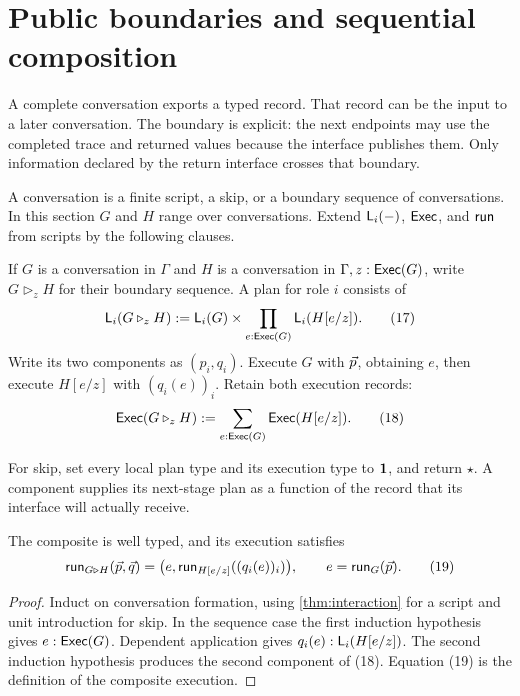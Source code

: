 \section{Public boundaries and sequential composition}
\label{sec:composition}

A complete conversation exports a typed record. That record can be the input
to a later conversation. The boundary is explicit: the next endpoints may use
the completed trace and returned values because the interface publishes them.
Only information declared by the return interface crosses that boundary.

A conversation is a finite script, a skip, or a boundary sequence of
conversations. In this section $G$ and $H$ range over conversations. Extend
$\mathsf L_{i}(-)$, $\mathsf{Exec}$, and $\mathsf{run}$ from scripts by the following clauses.

\begin{definition}
If $G$ is a conversation in $\Gamma$ and
$H$ is a conversation in $\Gamma,z:\mathsf{Exec}(G)$, write $G\mathbin{\triangleright_z}H$
for their boundary sequence. A plan for role $i$ consists of
\[
 \mathsf L_{i}(G\mathbin{\triangleright_z}H)
   :=\mathsf L_{i}(G)\times\prod_{e:\mathsf{Exec}(G)}\mathsf L_{i}(H[e/z]).
 \tag{17}
\]
Write its two components as $(p_i,q_i)$.
Execute $G$ with $\vec p$, obtaining $e$, then execute $H[e/z]$ with
$(q_i(e))_i$. Retain both execution records:
\[
 \mathsf{Exec}(G\mathbin{\triangleright_z}H)
       :=\sum_{e:\mathsf{Exec}(G)}\mathsf{Exec}(H[e/z]).
 \tag{18}
\]
\end{definition}

For skip, set every local plan type and its execution type to $\mathbf 1$, and
return $\star$. A component supplies its next-stage plan as a function of the
record that its interface will actually receive.

\begin{proposition}
\label{prop:sequence}
The composite is well typed, and its execution satisfies
\[
 \mathsf{run}_{G\triangleright H}(\vec p,\vec q)
   =\bigl(e,\mathsf{run}_{H[e/z]}((q_i(e))_i)\bigr),
 \qquad e=\mathsf{run}_G(\vec p).
 \tag{19}
\]
\end{proposition}
\begin{proof}
Induct on conversation formation, using \cref{thm:interaction} for a script
and unit introduction for skip. In the sequence case the first induction
hypothesis gives $e:\mathsf{Exec}(G)$. Dependent application gives
$q_i(e):\mathsf L_{i}(H[e/z])$. The second induction hypothesis produces the
second component of (18). Equation (19) is the definition of the composite
execution.
\end{proof}

